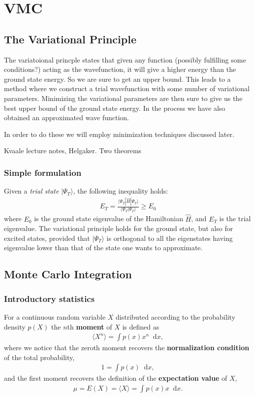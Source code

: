 \documentclass[twoside,english]{uiofysmaster}
\newcommand*\dif{\mathop{}\!\mathrm{d}}
\begin{document}
\section{VMC}
\subsection{The Variational Principle}
The variatoional princple states that given any function (possibly fulfilling some conditions?) acting as the wavefunction, it will give a higher energy than the ground state energy. So we are sure to get an upper bound. This leads to a method where we construct a trial wavefunction with some number of variational parameters. Minimizing the variational parameters are then sure to give us the best upper bound of the ground state energy. In the process we have also obtained an approximated wave function. 

In order to do these we will employ minimization techniques discussed later.

Kvaale lecture notes, Helgaker. Two theorems

\subsubsection{Simple formulation}
Given a \textit{trial state} $| \Psi_T \rangle$, the following inequality holds:
\begin{align}
	E_T = \frac{ \langle \Psi_T | \hat{H} | \Psi_T \rangle }{ \langle \Psi_T |\Psi_T \rangle } \geq E_0
\end{align}
where $E_0$ is the ground state eigenvalue of the Hamiltonian $\hat{H}$, and $E_T$ is the trial eigenvalue. The variational principle holds for the ground state, but also for excited states, provided that $|\Psi_T \rangle$ is orthogonal to all the eigenstates having eigenvalue lower than that of the state one wants to approximate.
\cite{HjortJensen2017}

\subsection{Monte Carlo Integration}
\subsubsection{Introductory statistics}

For a continuous random variable $X$ distributed according to the probability density $p(X)$ the $n$th \textbf{moment} of $X$ is defined as
\begin{align}
	\langle X^n \rangle = \int p(x) x^n \dif x ,
\end{align}
where we notice that the zeroth moment recovers the \textbf{normalization condition} of the total probability,
\begin{align}
	1 = \int p(x) \dif x ,
\end{align}
and the first moment recovers the definition of the \textbf{expectation value} of $X$, 
\begin{align}
	\mu = E(X) = \langle X \rangle = \int p(x) x \dif x .
\end{align}
\end{document}
